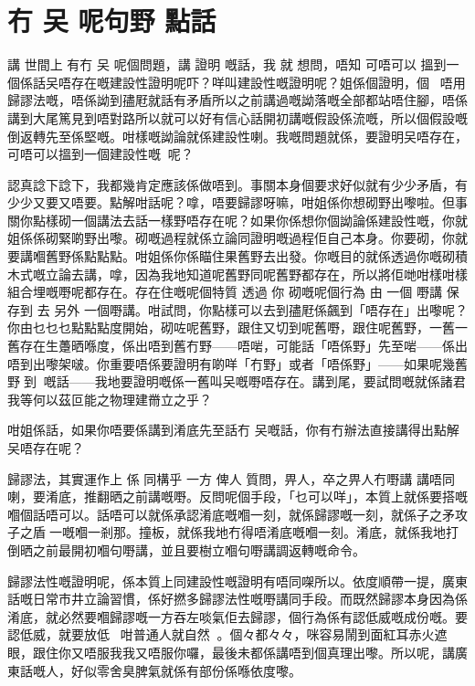 \chapter{冇 㕦 呢句野 點話}
講 世間上 有冇 㕦 呢個問題，講 證明 嘅話，我 就 想問，唔知 可唔可以 搵到一個係話㕦唔存在嘅建設性證明呢吓？咩叫建設性嘅證明呢？姐係個證明，個，唔用歸謬法嘅，唔係詏到孻屘就話有矛盾所以之前講過嘅詏落嘅全部都站唔住腳，唔係講到大尾篤見到唔對路所以就可以好有信心話開初講嘅假設係流嘅，所以個假設嘅倒返轉先至係堅嘅。咁樣嘅詏論就係建設性喇。我嘅問題就係，要證明㕦唔存在，可唔可以搵到一個建設性嘅呢？

認真諗下諗下，我都幾肯定應該係做唔到。事關本身個要求好似就有少少矛盾，有少少又要又唔要。點解咁話呢？嗱，唔要歸謬呀嘛，咁姐係你想砌野出嚟啦。但事關你點樣砌一個講法去話一樣野唔存在呢？如果你係想你個詏論係建設性嘅，你就姐係係砌緊啲野出嚟。砌嘅過程就係立論同證明嘅過程佢自己本身。你要砌，你就要講嗰舊野係點點點。咁姐係你係瞄住果舊野去出發。你嘅目的就係透過你嘅砌積木式嘅立論去講，嗱，因為我地知道呢舊野同呢舊野都存在，所以將佢哋咁樣咁樣組合埋嘅嘢呢都存在。存在住嘅呢個特質 透過 你 砌嘅呢個行為 由 一個 嘢講 保存到 去 另外 一個嘢講。咁試問，你點樣可以去到孻屘係飆到「唔存在」出嚟呢？你由乜乜乜點點點度開始，砌咗呢舊野，跟住又切到呢舊嘢，跟住呢舊野，一舊一舊存在生躉晒喺度，係出唔到舊冇野——唔啱，可能話「唔係野」先至啱——係出唔到出嚟架啵。你重要唔係要證明有啲咩「冇野」或者「唔係野」——如果呢幾舊野到嘅話——我地要證明嘅係一舊叫㕦嘅嘢唔存在。講到尾，要試問嘅就係諸君我等何以茲叵能之物理建黹立之乎？

咁姐係話，如果你唔要係講到淆底先至話冇 㕦嘅話，你有冇辦法直接講得出點解㕦唔存在呢？

歸謬法，其實運作上 係 同構乎 一方 俾人 質問，畀人，卒之畀人冇嘢講 講唔同喇，要淆底，推翻晒之前講嘅嘢。反問呢個手段，「乜可以咩」，本質上就係要搭嘅嗰個話唔可以。話唔可以就係承認淆底嘅嗰一刻，就係歸謬嘅一刻，就係子之矛攻子之盾一嘅嗰一剎那。撞板，就係我地冇得唔淆底嘅嗰一刻。淆底，就係我地打倒晒之前最開初嗰句嘢講，並且要樹立嗰句嘢講調返轉嘅命令。

歸謬法性嘅證明呢，係本質上同建設性嘅證明有唔同㗎所以。依度順帶一提，廣東話嘅日常市井立論習慣，係好撚多歸謬法性嘅嘢講同手段。而既然歸謬本身因為係淆底，就必然要嗰歸謬嘅一方吞左啖氣佢去歸謬，個行為係有認低威嘅成份嘅。要認低威，就要放低，咁普通人就自然󱛒󰸒。個々都々々，咪容易鬧到面紅耳赤火遮眼，跟住你又唔服我我又唔服你囉，最後未都係講唔到個真理出嚟。所以呢，講廣東話嘅人，好似零舍臭脾氣就係有部份係喺依度嚟。

